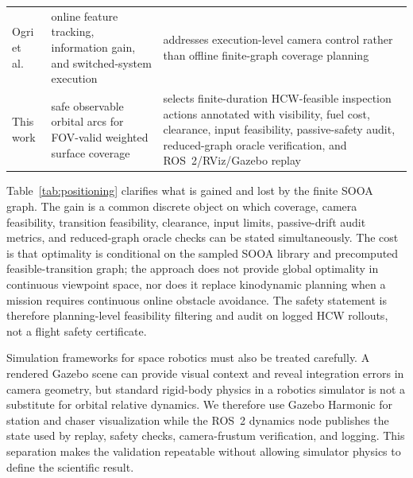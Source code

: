 \begin{table}[t]
\begin{tabularx}{\textwidth}{@{}>{\RaggedRight\arraybackslash}p{}>{\RaggedRight\arraybackslash}p{}>{\RaggedRight\arraybackslash}X@{}}
    Ogri et al.~\cite{ogri2025switched} &
    online feature tracking, information gain, and switched-system execution &
    addresses execution-level camera control rather than offline finite-graph
    coverage planning \\
    This work &
    safe observable orbital arcs for FOV-valid weighted surface coverage &
    selects finite-duration HCW-feasible inspection actions annotated with
    visibility, fuel cost, clearance, input feasibility, passive-safety audit,
    reduced-graph oracle verification, and ROS~2/RViz/Gazebo replay \\
    \bottomrule
  \end{tabularx}
\end{table}

Table~\ref{tab:positioning} clarifies what is gained and lost by the finite
SOOA graph. The gain is a common discrete object on which coverage, camera
feasibility, transition feasibility, clearance, input limits, passive-drift
audit metrics, and reduced-graph oracle checks can be stated simultaneously.
The cost is that optimality is conditional on the sampled SOOA library and
precomputed feasible-transition graph; the approach does not provide global
optimality in continuous viewpoint space, nor does it replace kinodynamic
planning when a mission requires continuous online obstacle avoidance. The
safety statement is therefore planning-level feasibility filtering and audit
on logged HCW rollouts, not a flight safety certificate.

Simulation frameworks for space robotics must also be treated carefully. A
rendered Gazebo scene can provide visual context and reveal integration errors
in camera geometry, but standard rigid-body physics in a robotics simulator is
not a substitute for orbital relative dynamics. We therefore use Gazebo
Harmonic for station and chaser visualization while the ROS~2 dynamics node
publishes the state used by replay, safety checks, camera-frustum
verification, and logging. This separation makes the validation repeatable
without allowing simulator physics to define the scientific result.
